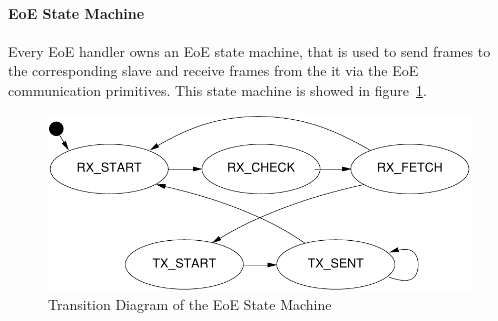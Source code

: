 \documentclass[a4paper,12pt,BCOR6mm,bibtotoc,idxtotoc]{scrbook}
\begin{document}
\paragraph{EoE State Machine}

Every EoE handler owns an EoE state machine, that is used to send frames to
the corresponding slave and receive frames from the it via the EoE
communication primitives. This state machine is showed in
figure~\ref{fig:fsm-eoe}.

\begin{figure}[htbp]
  \centering
  \includegraphics[width=.7\textwidth]{images/fsm-eoe} %
  \caption{Transition Diagram of the EoE State Machine}
  \label{fig:fsm-eoe}
\end{figure}

\end{document}
